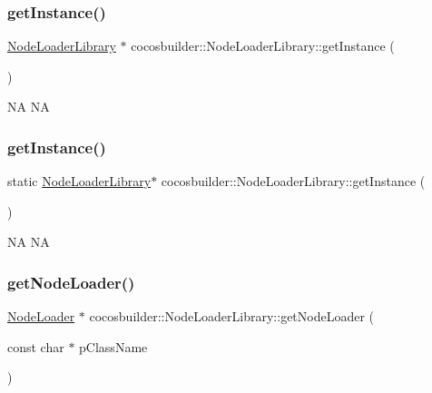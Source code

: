 \subsubsection{\texorpdfstring{get\+Instance()}{getInstance()}\hspace{0.1cm}{\footnotesize\ttfamily [1/2]}}
{\footnotesize\ttfamily \hyperlink{classcocosbuilder_1_1NodeLoaderLibrary}{Node\+Loader\+Library} $\ast$ cocosbuilder\+::\+Node\+Loader\+Library\+::get\+Instance (\begin{DoxyParamCaption}{ }\end{DoxyParamCaption})\hspace{0.3cm}{\ttfamily [static]}}

NA  NA \mbox{\label{classcocosbuilder_1_1NodeLoaderLibrary_a2e11d16961b9509f5f5c2af1046419c0}} 
\subsubsection{\texorpdfstring{get\+Instance()}{getInstance()}\hspace{0.1cm}{\footnotesize\ttfamily [2/2]}}
{\footnotesize\ttfamily static \hyperlink{classcocosbuilder_1_1NodeLoaderLibrary}{Node\+Loader\+Library}$\ast$ cocosbuilder\+::\+Node\+Loader\+Library\+::get\+Instance (\begin{DoxyParamCaption}{ }\end{DoxyParamCaption})\hspace{0.3cm}{\ttfamily [static]}}

NA  NA \mbox{\label{classcocosbuilder_1_1NodeLoaderLibrary_a0a4d080516631cff92908b4ae06dadf8}} 
\subsubsection{\texorpdfstring{get\+Node\+Loader()}{getNodeLoader()}\hspace{0.1cm}{\footnotesize\ttfamily [1/2]}}
{\footnotesize\ttfamily \hyperlink{classcocosbuilder_1_1NodeLoader}{Node\+Loader} $\ast$ cocosbuilder\+::\+Node\+Loader\+Library\+::get\+Node\+Loader (\begin{DoxyParamCaption}\item[{const char $\ast$}]{p\+Class\+Name }\end{DoxyParamCaption})}

